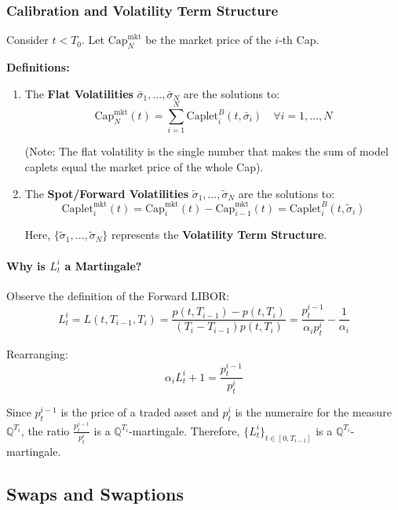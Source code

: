\documentclass[12pt,a4paper]{article}
\theoremstyle{definition}
\newcommand{\Q}{\mathbb{Q}}
\begin{document}
\subsubsection{Calibration and Volatility Term Structure}

Consider $t < T_0$. Let $\text{Cap}_N^{\text{mkt}}$ be the market price of the $i$-th Cap.

\textbf{Definitions:}

\begin{enumerate}
\item The \textbf{Flat Volatilities} $\bar{\sigma}_1, \ldots, \bar{\sigma}_N$ are the solutions to:
\[
\text{Cap}_N^{\text{mkt}}(t) = \sum_{i=1}^N \text{Caplet}_i^B(t, \bar{\sigma}_i) \quad \forall i = 1, \ldots, N
\]

(Note: The flat volatility is the single number that makes the sum of model caplets equal the market price of the whole Cap).

\item The \textbf{Spot/Forward Volatilities} $\tilde{\sigma}_1, \ldots, \tilde{\sigma}_N$ are the solutions to:
\[
\text{Caplet}_i^{\text{mkt}}(t) = \text{Cap}_i^{\text{mkt}}(t) - \text{Cap}_{i-1}^{\text{mkt}}(t) = \text{Caplet}_i^B(t, \tilde{\sigma}_i)
\]

Here, $\{\tilde{\sigma}_1, \ldots, \tilde{\sigma}_N\}$ represents the \textbf{Volatility Term Structure}.
\end{enumerate}

\paragraph{Why is $L_t^i$ a Martingale?} 

Observe the definition of the Forward LIBOR:
\[
L_t^i = L(t, T_{i-1}, T_i) = \frac{p(t, T_{i-1}) - p(t, T_i)}{(T_i - T_{i-1})p(t, T_i)} = \frac{p_t^{i-1}}{\alpha_i p_t^i} - \frac{1}{\alpha_i}
\]

Rearranging:
\[
\alpha_i L_t^i + 1 = \frac{p_t^{i-1}}{p_t^i}
\]

Since $p_t^{i-1}$ is the price of a traded asset and $p_t^i$ is the numeraire for the measure $\Q^{T_i}$, the ratio $\frac{p_t^{i-1}}{p_t^i}$ is a $\Q^{T_i}$-martingale. Therefore, $\{L_t^i\}_{t \in [0, T_{i-1}]}$ is a $\Q^{T_i}$-martingale.

\subsection{Swaps and Swaptions}
\end{document}

